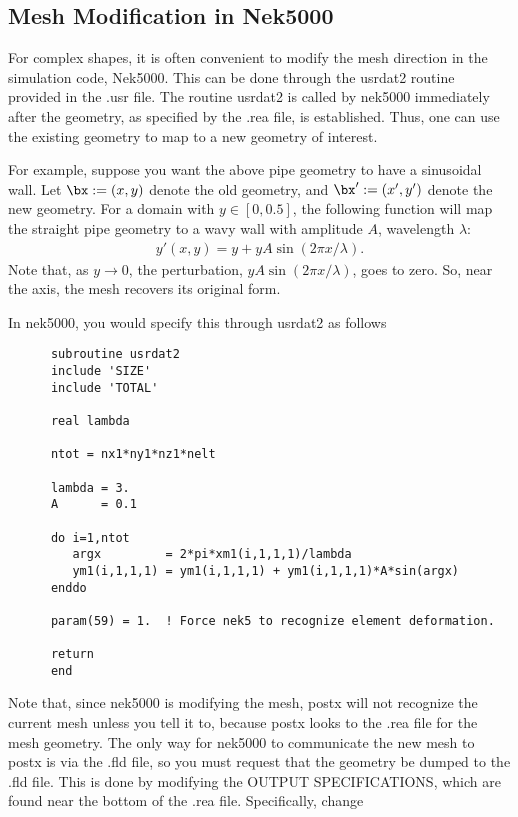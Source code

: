 \subsection{Mesh Modification in Nek5000}

For complex shapes, it is often convenient to modify the mesh
direction in the simulation code, Nek5000.  This can be done
through the usrdat2 routine provided in the .usr file.
The routine usrdat2 is called by nek5000 immediately after
the geometry, as specified by the .rea file, is established.
Thus, one can use the existing geometry to map to a new geometry
of interest.

For example, suppose you want the above pipe geometry to have
a sinusoidal wall.  Let \(\bx := (x,y)\) denote the old geometry,
and \(\bx' := (x',y')\) denote the new geometry.  For a domain
with \(y\in [0,0.5]\), the following function will map the straight
pipe geometry to a wavy wall with amplitude \(A\), wavelength \(\lambda\):
\begin{eqnarray*}
y'(x,y) = y  + y A \sin( 2 \pi x / \lambda ).
\end{eqnarray*}
Note that, as \(y \longrightarrow 0\), the perturbation, 
\(yA \sin( 2 \pi x / \lambda )\), goes to zero.  So, near the axis,
the mesh recovers its original form.

In nek5000, you would specify this through usrdat2 as follows


\begin{verbatim}
      subroutine usrdat2
      include 'SIZE'
      include 'TOTAL'

      real lambda

      ntot = nx1*ny1*nz1*nelt

      lambda = 3.
      A      = 0.1

      do i=1,ntot
         argx         = 2*pi*xm1(i,1,1,1)/lambda
         ym1(i,1,1,1) = ym1(i,1,1,1) + ym1(i,1,1,1)*A*sin(argx)
      enddo

      param(59) = 1.  ! Force nek5 to recognize element deformation.

      return
      end
\end{verbatim}
\noindent
Note that, since nek5000 is modifying the mesh, postx will not
recognize the current mesh unless you tell it to, because postx
looks to the .rea file for the mesh geometry.  The only way for
nek5000 to communicate the new mesh to postx is via the .fld
file, so you must request that the geometry be dumped to the
.fld file.   This is done by modifying the OUTPUT SPECIFICATIONS,
which are found near the bottom of the .rea file.  Specifically,
change

